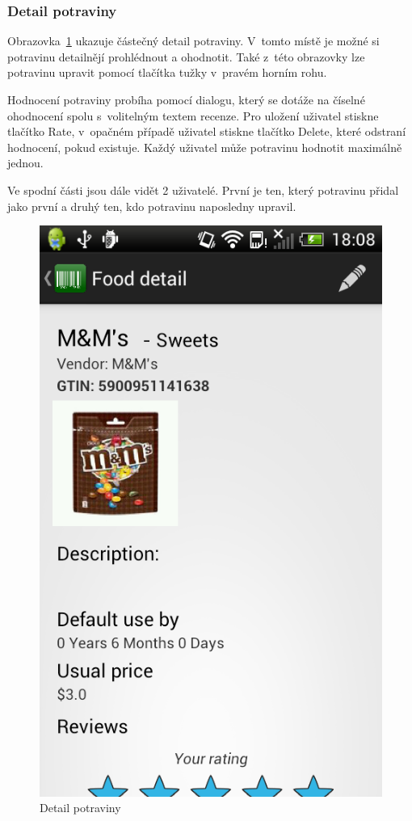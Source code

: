 \documentclass[thesis=B,czech]{FITthesis}[2013/10/20]
\begin{document}
\clearpage

\subsubsection{Detail potraviny}

Obrazovka~\ref{fig:AppFoodDetail} ukazuje částečný detail potraviny. V~tomto místě je možné si potravinu detailnějí prohlédnout a ohodnotit. Také z~této obrazovky lze potravinu upravit pomocí tlačítka tužky v~pravém horním rohu.

Hodnocení potraviny probíha pomocí dialogu, který se dotáže na číselné ohodnocení spolu s~volitelným textem recenze. Pro uložení uživatel stiskne tlačítko Rate, v~opačném případě uživatel stiskne tlačítko Delete, které odstraní hodnocení, pokud existuje. Každý uživatel může potravinu hodnotit maximálně jednou.

Ve spodní části jsou dále vidět 2 uživatelé. První je ten, který potravinu přidal jako první a druhý ten, kdo potravinu naposledny upravil.

\begin{figure}[H]
  \centering
  \includegraphics[scale=0.4]{screenshots/app_food_detail.png}
  \caption{Detail potraviny}
  \label{fig:AppFoodDetail}
\end{figure}
\end{document}
